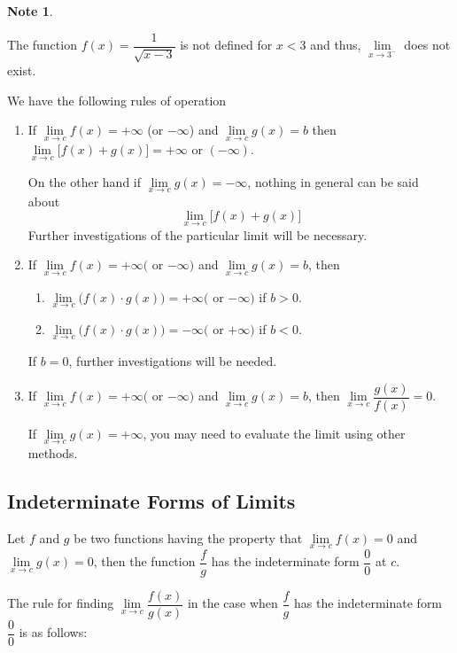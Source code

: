 \documentclass[11pt,a4paper]{article}
\theoremstyle{definition}
\newtheorem*{note}{Note}
\begin{document}
\begin{note}
\end{note}


The function $f(x) = \dfrac{1}{\sqrt{x - 3}}$ is not defined for $x < 3$ and thus, $\lim\limits_{x\rightarrow 3^-}$ does not exist.


We have the following rules of operation
\begin{enumerate}
\item If $\lim\limits_{x\rightarrow c}f(x) = +\infty$ (or $-\infty$) and $\lim\limits_{x\rightarrow c}g(x) = b$ then $\lim\limits_{x\rightarrow c}\big[f(x) + g(x)\big]= + \infty$ or $(-\infty)$.

On the other hand if $\lim\limits_{x\rightarrow c}g(x) = -\infty$, nothing in general can be said about $$\lim\limits_{x\rightarrow c}\big[ f(x)+g(x)\big]$$ Further investigations of the particular limit will be necessary.

\item If $\lim\limits_{x\rightarrow c}f(x) = +\infty ($ or $-\infty)$ and  $\lim\limits_{x\rightarrow c}g(x) = b$, then 
\begin{enumerate}
     \item $\lim\limits_{x\rightarrow c}\big(f(x)\cdot g(x)\big) = +\infty ($ or $-\infty)$ if $b>0$.
     \item $\lim\limits_{x\rightarrow c}\big(f(x)\cdot g(x)\big) = -\infty ($ or $+\infty)$ if $b< 0$.
\end{enumerate}
 If $b = 0$, further investigations will be needed.

\item If $\lim\limits_{x\rightarrow c}f(x) = + \infty ($ or $-\infty)$ and $\lim\limits_{x\rightarrow c}g(x) = b$, then $\lim\limits_{x\rightarrow c}\dfrac{g(x)}{f(x)}=0$.

If $\lim\limits_{x\rightarrow c}g(x) = + \infty$, you may need to evaluate the limit using other methods.\
\end{enumerate}

\subsection{Indeterminate Forms of Limits}
Let  $f$ and $g$ be two functions having the property that $\lim\limits_{x\rightarrow c}f(x) = 0$ and $\lim\limits_{x\rightarrow c}g(x) =0$, then the function $\dfrac{f}{g}$ has the indeterminate form $\dfrac{0}{0}$ at $c$.


The rule for finding $\lim\limits_{x\rightarrow c}\dfrac{f(x)}{g(x)}$ in the case when $\dfrac{f}{g}$ has the indeterminate form $\dfrac{0}{0}$ is as follows:
\end{document}
